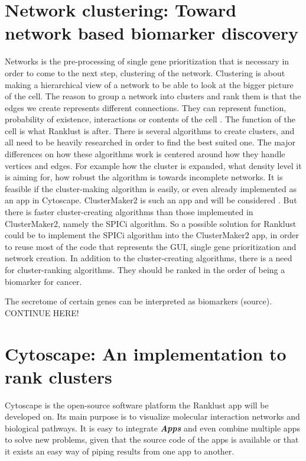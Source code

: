 \documentclass[UKenglish]{ifimaster}
\begin{document}
\chapter{Network clustering: Toward network based biomarker discovery}
Networks is the pre-processing of single gene prioritization that is necessary in order to come to the next step,
clustering of the network. Clustering is about making a hierarchical view of a network to be able to look at the bigger
picture of the cell. The reason to group a network into clusters and rank them is that the edges we create represents
different connections. They can represent function, probability of existence, interactions or contents of the cell
\cite{siri}. The function of the cell is what Ranklust is after. There is several algorithms to create clusters, and all
need to be heavily researched in order to find the best suited one. The major differences on how these algorithms work
is centered around how they handle vertices and edges. For example how the cluster is expanded, what density level it is
aiming for, how robust the algorithm is towards incomplete networks. It is feasible if the cluster-making algorithm is
easily, or even already implemented as an app in Cytoscape. ClusterMaker2 is such an app and will be considered
\cite{cm2}. But there is faster cluster-creating algorithms than those implemented in ClusterMaker2, namely the SPICi
\cite{spici} algorithm. So a possible solution for Ranklust could be to implement the SPICi algorithm into the
ClusterMaker2 app, in order to reuse most of the code that represents the GUI, single gene prioritization and network
creation. In addition to the cluster-creating algorithms, there is a need for cluster-ranking algorithms. They should be
ranked in the order of being a biomarker for cancer.


The secretome of certain genes can be interpreted as biomarkers (source). CONTINUE HERE!

\chapter{Cytoscape: An implementation to rank clusters}
Cytoscape is the open-source software platform the Ranklust app will be developed on. Its main purpose is to visualize
molecular interaction networks and biological pathways.  It is easy to integrate \textbf{\textit{Apps}} and even combine 
multiple apps to solve new problems, given that the source code of the apps is available or that it exists an easy way of 
piping results from one app to another. 
\end{document}
